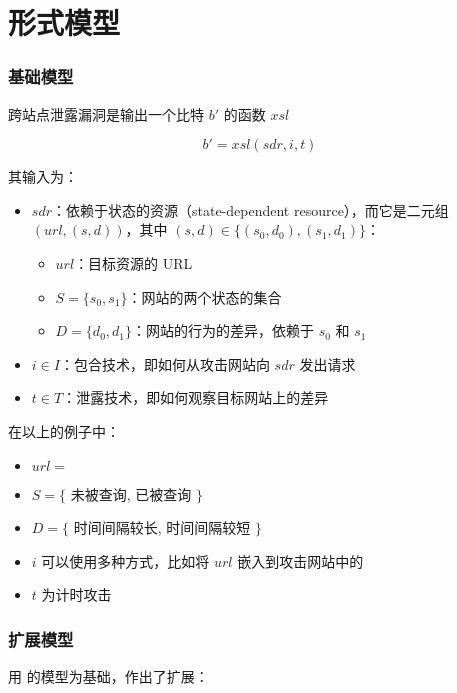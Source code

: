 \section{形式模型}

\subsubsection{基础模型\cite{modelbase}}

跨站点泄露漏洞是输出一个比特 $b'$ 的函数 $xsl$

$$b'=xsl(sdr, i, t)$$

其输入为：

\begin{itemize}
    \item $sdr$：依赖于状态的资源（state-dependent resource），而它是二元组 $(url, (s, d))$，其中 $(s, d)\in\{(s_0, d_0), (s_1, d_1)\}$：
    \begin{itemize}
        \item $url$：目标资源的 URL
        \item $S=\{s_0, s_1\}$：网站的两个状态的集合
        \item $D=\{d_0, d_1\}$：网站的行为的差异，依赖于 $s_0$ 和 $s_1$
    \end{itemize}
    \item $i\in I$：包合技术，即如何从攻击网站向 $sdr$ 发出请求
    \item $t\in T$：泄露技术，即如何观察目标网站上的差异
\end{itemize}

在以上的例子中：

\begin{itemize}
    \item $url=$ 
    \item $S=\{$  未被查询,  已被查询 $\}$
    \item $D=\{$ 时间间隔较长, 时间间隔较短 $\}$
    \item $i$ 可以使用多种方式，比如将 $url$ 嵌入到攻击网站中的 
    \item $t$ 为计时攻击
\end{itemize}

\subsubsection{扩展模型 \cite{modelext}}

\citeauthor{modelext} 用 \citeauthor{modelbase} 的模型为基础，作出了扩展：

